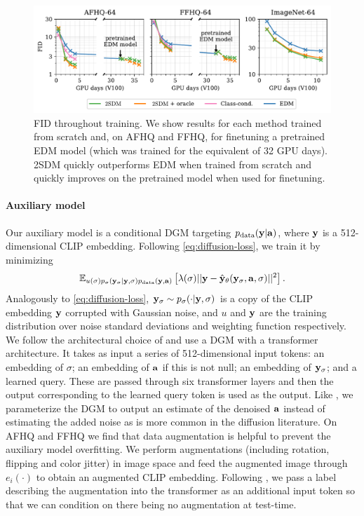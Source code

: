 \begin{figure}[t]
    \centering
    \includegraphics[width=\textwidth]{figs/2sdm/cond-results-1.pdf}
    \caption{FID throughout training. We show results for each method trained from scratch and, on AFHQ and FFHQ, for finetuning a pretrained EDM model (which was trained for the equivalent of 32 GPU days). 2SDM quickly outperforms EDM when trained from scratch and quickly improves on the pretrained model when used for finetuning.}
    \label{fig:fid_vs_training}
\end{figure}

\paragraph{Auxiliary model}
Our auxiliary model is a conditional DGM targeting $p_{\rm{data}}({\mathbf{y}}|{\mathbf{a}})$, where ${\mathbf{y}}$ is a 512-dimensional CLIP embedding. Following \cref{eq:diffusion-loss}, we train it by minimizing
\begin{equation}
\label{eq:auxiliary-model-objective}
    \mathbb{E}_{u(\sigma)p_\sigma({\mathbf{y}}_\sigma|{\mathbf{y}},\sigma)p_{\rm{data}}({\mathbf{y}},{\mathbf{a}})} \left[ \lambda(\sigma) \lvert\lvert {\mathbf{y}} - \hat{{\mathbf{y}}}_\theta({\mathbf{y}}_\sigma, {\mathbf{a}}, \sigma) \rvert\rvert^2 \right].
\end{equation}
Analogously to \cref{eq:diffusion-loss}, ${\mathbf{y}}_\sigma \sim p_\sigma(\cdot|{\mathbf{y}},\sigma)$ is a copy of the CLIP embedding ${\mathbf{y}}$ corrupted with Gaussian noise, and $u$ and ${\mathbf{y}}$ are the training distribution over noise standard deviations and weighting function respectively.
We follow the architectural choice of \citet{ramesh2022hierarchical} and use a DGM with a transformer architecture. It takes as input a series of 512-dimensional input tokens: an embedding of $\sigma$; an embedding of ${\mathbf{a}}$ if this is not null; an embedding of ${\mathbf{y}}_\sigma$; and a learned query. These are passed through six transformer layers and then the output corresponding to the learned query token is used as the output. Like \citet{ramesh2022hierarchical}, we parameterize the DGM to output an estimate of the denoised ${\mathbf{a}}$ instead of estimating the added noise as is more common in the diffusion literature.
%
On AFHQ and FFHQ we find that data augmentation is helpful to prevent the auxiliary model overfitting. We perform augmentations (including rotation, flipping and color jitter) in image space and feed the augmented image through $e_i(\cdot)$ to obtain an augmented CLIP embedding. Following \citet{karras2022elucidating}, we pass a label describing the augmentation into the transformer as an additional input token so that we can condition on there being no augmentation at test-time.

